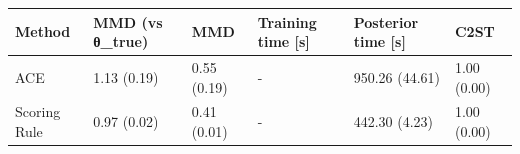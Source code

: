 \begin{tabular}{llllll}
\toprule
Method & MMD (vs θ_true) & MMD & Training time [s] & Posterior time [s] & C2ST \\
\midrule
ACE & 1.13 (0.19) & 0.55 (0.19) & - & 950.26 (44.61) & 1.00 (0.00) \\
Scoring Rule & 0.97 (0.02) & 0.41 (0.01) & - & 442.30 (4.23) & 1.00 (0.00) \\
\bottomrule
\end{tabular}
